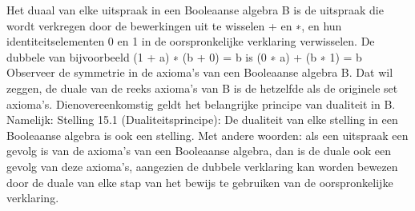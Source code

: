 \documentclass{article}
\begin{document}
	Het duaal van elke uitspraak in een Booleaanse algebra B is de uitspraak die wordt verkregen door de bewerkingen uit te wisselen
	+ en ∗, en hun identiteitselementen 0 en 1 in de oorspronkelijke verklaring verwisselen. De dubbele van bijvoorbeeld
	(1 + a) ∗ (b + 0) = b is (0 ∗ a) + (b ∗ 1) = b
	Observeer de symmetrie in de axioma's van een Booleaanse algebra B. Dat wil zeggen, de duale van de reeks axioma's van B is de
	hetzelfde als de originele set axioma's. Dienovereenkomstig geldt het belangrijke principe van dualiteit in B. Namelijk:
	Stelling 15.1 (Dualiteitsprincipe): De dualiteit van elke stelling in een Booleaanse algebra is ook een stelling.
	Met andere woorden: als een uitspraak een gevolg is van de axioma's van een Booleaanse algebra, dan is de duale ook een
	gevolg van deze axioma's, aangezien de dubbele verklaring kan worden bewezen door de duale van elke stap van het bewijs te gebruiken
	van de oorspronkelijke verklaring.
	
	
	
\end{document}

